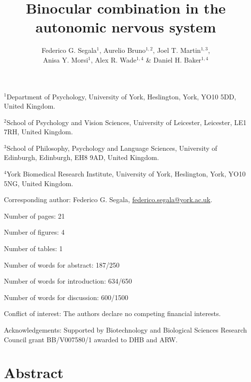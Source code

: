 \documentclass[
]{article}
\title{Binocular combination in the autonomic nervous system}
\author{Federico G. Segala\(^1\), Aurelio Bruno\(^{1,2}\), Joel T. Martin\(^{1,3}\),\\
Anisa Y. Morsi\(^1\), Alex R. Wade\(^{1,4}\) \& Daniel H. Baker\(^{1,4}\)}
\date{}
\begin{document}
\maketitle

\(^1\)Department of Psychology, University of York, Heslington, York, YO10 5DD, United Kingdom.

\(^2\)School of Psychology and Vision Sciences, University of Leicester, Leicester, LE1 7RH, United Kingdom.

\(^3\)School of Philosophy, Psychology and Language Sciences, University of Edinburgh, Edinburgh, EH8 9AD, United Kingdom.

\(^4\)York Biomedical Research Institute, University of York, Heslington, York, YO10 5NG, United Kingdom.

Corresponding author: Federico G. Segala, \url{federico.segala@york.ac.uk}.

Number of pages: 21

Number of figures: 4

Number of tables: 1

Number of words for abstract: 187/250

Number of words for introduction: 634/650

Number of words for discussion: 600/1500

Conflict of interest: The authors declare no competing financial interests.

Acknowledgements: Supported by Biotechnology and Biological Sciences Research Council grant BB/V007580/1 awarded to DHB and ARW.

\pagebreak

\hypertarget{abstract}{%
\section{Abstract}\label{abstract}}
\end{document}
